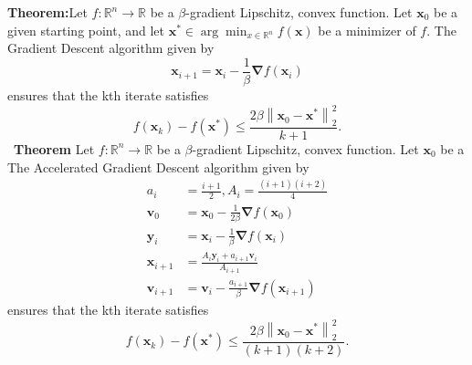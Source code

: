 \textbf{Theorem:}Let $f: \mathbb{R}^{n} \rightarrow \mathbb{R}$ be a $\beta$-gradient Lipschitz, convex function. Let $\boldsymbol{x}_{0}$ be a given starting point, and let $\boldsymbol{x}^{*} \in \arg \min _{x \in \mathbb{R}^{n}} f(\boldsymbol{x})$ be a minimizer of $f$. The Gradient Descent algorithm given by
$$
\boldsymbol{x}_{i+1}=\boldsymbol{x}_{i}-\frac{1}{\beta} \boldsymbol{\nabla} f\left(\boldsymbol{x}_{i}\right)
$$
ensures that the kth iterate satisfies
$$
f\left(\boldsymbol{x}_{k}\right)-f\left(\boldsymbol{x}^{*}\right) \leq \frac{2 \beta\left\|\boldsymbol{x}_{0}-\boldsymbol{x}^{*}\right\|_{2}^{2}}{k+1} .
$$
\
\textbf{Theorem} Let $f: \mathbb{R}^{n} \rightarrow \mathbb{R}$ be a $\beta$-gradient Lipschitz, convex function. Let $\boldsymbol{x}_{0}$ be a
The Accelerated Gradient Descent algorithm given by
$$
\begin{aligned}
a_{i} &=\frac{i+1}{2}, A_{i}=\frac{(i+1)(i+2)}{4} \\
\boldsymbol{v}_{0} &=\boldsymbol{x}_{0}-\frac{1}{2 \beta} \boldsymbol{\nabla} f\left(\boldsymbol{x}_{0}\right) \\
\boldsymbol{y}_{i} &=\boldsymbol{x}_{i}-\frac{1}{\beta} \boldsymbol{\nabla} f\left(\boldsymbol{x}_{i}\right) \\
\boldsymbol{x}_{i+1} &=\frac{A_{i} \boldsymbol{y}_{i}+a_{i+1} \boldsymbol{v}_{i}}{A_{i+1}} \\
\boldsymbol{v}_{i+1} &=\boldsymbol{v}_{i}-\frac{a_{i+1}}{\beta} \boldsymbol{\nabla} f\left(\boldsymbol{x}_{i+1}\right)
\end{aligned}
$$
ensures that the kth iterate satisfies
$$
f\left(\boldsymbol{x}_{k}\right)-f\left(\boldsymbol{x}^{*}\right) \leq \frac{2 \beta\left\|\boldsymbol{x}_{0}-\boldsymbol{x}^{*}\right\|_{2}^{2}}{(k+1)(k+2)} .
$$

